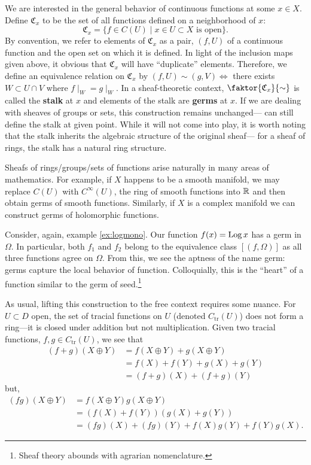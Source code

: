 We are interested in the general behavior of continuous functions at some
\(x \in X\). Define \(\mathfrak{C}_x\) to be the set of all functions defined on a
neighborhood of \(x\):
\[
  \mathfrak{C}_x = \{f \in C(U) \mid x \in U \subset X \text{ is open}\}.
\]
By convention, we refer to elements of \(\mathfrak{C}_x\) as a pair, \((f,U)\) of
a continuous function and the open set on which it is defined.
In light of the inclusion maps given above, it obvious that \(\mathfrak{C}_x\)
will have ``duplicate'' elements. Therefore, we define an equivalence relation
on \(\mathfrak{C}_x\) by \((f,U) \sim (g,V) \Leftrightarrow\) there exists
\(W \subset U \cap V\) where \(f \mid _W = g\mid _W\). In a sheaf-theoretic
context, \(\faktor{\mathfrak{C}_x}{\sim} \) is called the \textbf{stalk} at \(x\)
and elements of the stalk are \textbf{germs} at \(x\). If we are dealing with
sheaves of groups or sets, this construction remains unchanged---\ie{} can still
define the stalk at given point. While it will not come into play, it is worth
noting that the stalk inherits the algebraic structure of the original
sheaf---\eg{} for a sheaf of rings, the stalk has a natural ring
structure.

Sheafs of rings/groups/sets of functions arise naturally in many areas of
mathematics. For example, if \(X\) happens to be a smooth manifold, we may
replace \(C(U)\) with \(C^\infty(U)\), the ring of smooth functions into
\(\mathbb{R} \) and then obtain germs of smooth functions.  Similarly, if \(X\) is a
complex manifold we can construct germs of holomorphic functions.

\begin{example}
Consider, again, example \ref{ex:logmono}. Our function \(f(x)= \operatorname{Log} x\) has
a germ in \(\Omega\). In particular, both \(f_1\) and \(f_2\) belong to the
equivalence class \([(f,\Omega)]\) as all three functions agree on \(\Omega\).
From this, we see the aptness of the name germ: germs capture the
local behavior of function. Colloquially, this is the ``heart'' of a
function similar to the germ of seed.\footnote{Sheaf theory abounds with
  agrarian nomenclature.}
\end{example}


As usual, lifting this construction to the free context requires some nuance.
For \(U \subset D\) open, the set of tracial functions on \(U\) (denoted
\(C_{\text{tr}}(U)\)) does not form a ring---it is closed under addition but not
multiplication. Given two tracial functions, \(f,g \in C_{\text{tr}}(U)\), we see
that
\begin{align*}
  (f+g)(X \oplus Y) &= f(X \oplus Y) + g(X \oplus Y) \\
                    &= f(X) + f(Y)+g(X) + g(Y) \\
                    &= (f+g) (X) + (f+g)(Y)
\end{align*}
but,
\begin{align*}
  (fg)(X \oplus Y) &= f(X \oplus Y)g(X \oplus Y) \\
                   &= (f(X) + f(Y))(g(X) + g(Y)) \\
                   &= (fg) (X) + (fg)(Y) + f(X)g(Y)+f(Y)g(X).
\end{align*}

